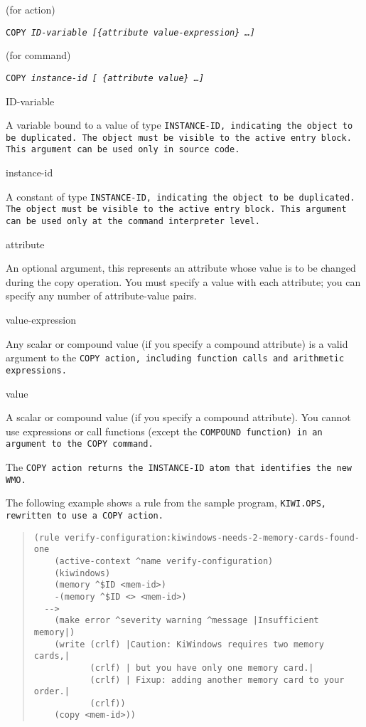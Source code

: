 \Format (for action)

\tt{COPY} \it{ID-variable} [\{\ct\it{attribute} \it{value-expression}\} \ldots]

\Format (for command)

\tt{COPY} \it{instance-id} [ \{\ct\it{attribute} \it{value}\} \ldots]

\begin{arguments}
\item[ID-variable]

  A variable bound to a value of type \tt{INSTANCE-ID}, indicating the
  object to be duplicated. The object must be visible to the active
  entry block. This argument can be used only in source code.

\item[instance-id]

  A constant of type \tt{INSTANCE-ID}, indicating the object to be
  duplicated. The object must be visible to the active entry
  block. This argument can be used only at the command interpreter
  level.

\item[attribute]

  An optional argument, this represents an attribute whose value is to
  be changed during the copy operation. You must specify a value with
  each attribute; you can specify any number of attribute-value pairs.

\item[value-expression]

  Any scalar or compound value (if you specify a compound attribute)
  is a valid argument to the \tt{COPY} action, including function
  calls and arithmetic expressions.

\item[value]

  A scalar or compound value (if you specify a compound
  attribute). You cannot use expressions or call functions (except the
  \tt{COMPOUND} function) in an argument to the \tt{COPY} command.
\end{arguments}

\ReturnValue

The \tt{COPY} action returns the \tt{INSTANCE-ID} atom that identifies
the new WMO.

\Example

The following example shows a rule from the sample program,
\tt{KIWI.OPS}, rewritten to use a \tt{COPY} action.

\begin{quote}
\begin{verbatim}
(rule verify-configuration:kiwindows-needs-2-memory-cards-found-one
    (active-context ^name verify-configuration)
    (kiwindows)
    (memory ^$ID <mem-id>)
    -(memory ^$ID <> <mem-id>)
  -->
    (make error ^severity warning ^message |Insufficient memory|)
    (write (crlf) |Caution: KiWindows requires two memory cards,|
           (crlf) | but you have only one memory card.|
           (crlf) | Fixup: adding another memory card to your order.|
           (crlf))
    (copy <mem-id>))
\end{verbatim}
\end{quote}

